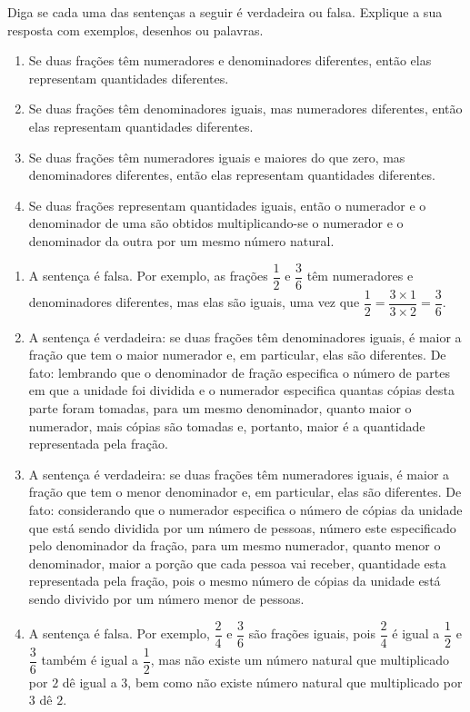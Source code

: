 \documentclass[10 pt,usenames,dvipsnames, oneside]{article}
\begin{document}
Diga se cada uma das sentenças a seguir é verdadeira ou falsa. Explique a sua resposta com exemplos, desenhos ou palavras.
\begin{enumerate}
 \item  Se duas frações têm numeradores e denominadores diferentes, então elas representam quantidades diferentes.
 \item Se duas frações têm denominadores iguais, mas numeradores diferentes, então elas representam quantidades diferentes.
 \item Se duas frações têm numeradores iguais e maiores do que zero, mas denominadores diferentes, então elas representam quantidades diferentes.
 \item Se duas frações representam quantidades iguais, então o numerador e o denominador de uma são obtidos multiplicando-se o numerador e o denominador da outra por um mesmo número natural.
\end{enumerate}


\ifdefined\prof
\begin{solucao}

\begin{enumerate}
  \item A sentença é falsa. Por exemplo, as frações $\dfrac{1}{2}$ e
$\dfrac{3}{6}$ têm numeradores e denominadores diferentes, mas elas são iguais,
uma vez que $\dfrac{1}{2} = \dfrac{3 \times 1}{3 \times 2} = \dfrac{3}{6}$.
    \item A sentença é verdadeira: se duas frações têm denominadores iguais, é
maior a fração que tem o maior numerador e, em particular, elas são diferentes.
De fato: lembrando que o denominador de fração especifica o número de partes em
que a unidade foi dividida e o numerador especifica quantas cópias desta parte
foram tomadas, para um mesmo denominador, quanto maior o numerador, mais cópias
são tomadas e, portanto, maior é a quantidade representada pela fração.
    \item  A sentença é verdadeira: se duas frações têm numeradores iguais, é
maior a fração que tem o menor denominador e, em particular, elas são
diferentes. De fato: considerando que o numerador especifica o número de cópias
da unidade que está sendo dividida por um número de pessoas, número este
especificado pelo denominador da fração, para um mesmo numerador, quanto menor o
denominador, maior a porção que cada pessoa vai receber, quantidade esta
representada pela fração, pois o mesmo número de cópias da unidade está sendo
divivido por um número menor de pessoas.
    \item A sentença é falsa. Por exemplo, $\dfrac{2}{4}$ e $\dfrac{3}{6}$ são
frações iguais, pois $\dfrac{2}{4}$ é igual a $\dfrac{1}{2}$ e $\dfrac{3}{6}$
também é igual a $\dfrac{1}{2}$, mas não existe um número natural que
multiplicado por $2$ dê igual a $3$, bem como não existe número natural que
multiplicado por $3$ dê $2$.
\end{enumerate}

\end{solucao}
\fi
\end{document}
